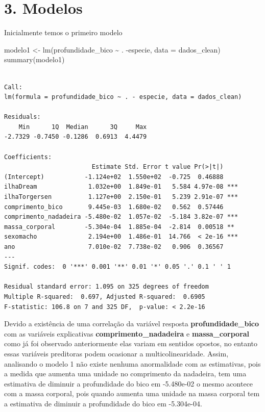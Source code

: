 \documentclass[
  letterpaper,
  DIV=11,
  numbers=noendperiod]{scrartcl}
\newenvironment{Shaded}{\begin{snugshade}}{\end{snugshade}}
\newcommand{\AttributeTok}[1]{\textcolor[rgb]{0.40,0.45,0.13}{#1}}
\newcommand{\FunctionTok}[1]{\textcolor[rgb]{0.28,0.35,0.67}{#1}}
\newcommand{\NormalTok}[1]{\textcolor[rgb]{0.00,0.23,0.31}{#1}}
\newcommand{\OtherTok}[1]{\textcolor[rgb]{0.00,0.23,0.31}{#1}}
\newcommand{\SpecialCharTok}[1]{\textcolor[rgb]{0.37,0.37,0.37}{#1}}
\begin{document}
\section{3. Modelos}\label{modelos}

Inicialmente temos o primeiro modelo

\begin{Shaded}
\begin{Highlighting}[]
\NormalTok{modelo1 }\OtherTok{\textless{}{-}} \FunctionTok{lm}\NormalTok{(profundidade\_bico }\SpecialCharTok{\textasciitilde{}}\NormalTok{ . }\SpecialCharTok{{-}}\NormalTok{especie, }\AttributeTok{data =}\NormalTok{ dados\_clean)}
\FunctionTok{summary}\NormalTok{(modelo1)}
\end{Highlighting}
\end{Shaded}

\begin{verbatim}

Call:
lm(formula = profundidade_bico ~ . - especie, data = dados_clean)

Residuals:
    Min      1Q  Median      3Q     Max 
-2.7329 -0.7450 -0.1286  0.6913  4.4479 

Coefficients:
                        Estimate Std. Error t value Pr(>|t|)    
(Intercept)           -1.124e+02  1.550e+02  -0.725  0.46888    
ilhaDream              1.032e+00  1.849e-01   5.584 4.97e-08 ***
ilhaTorgersen          1.127e+00  2.150e-01   5.239 2.91e-07 ***
comprimento_bico       9.445e-03  1.680e-02   0.562  0.57446    
comprimento_nadadeira -5.480e-02  1.057e-02  -5.184 3.82e-07 ***
massa_corporal        -5.304e-04  1.885e-04  -2.814  0.00518 ** 
sexomacho              2.194e+00  1.486e-01  14.766  < 2e-16 ***
ano                    7.010e-02  7.738e-02   0.906  0.36567    
---
Signif. codes:  0 '***' 0.001 '**' 0.01 '*' 0.05 '.' 0.1 ' ' 1

Residual standard error: 1.095 on 325 degrees of freedom
Multiple R-squared:  0.697, Adjusted R-squared:  0.6905 
F-statistic: 106.8 on 7 and 325 DF,  p-value: < 2.2e-16
\end{verbatim}

Devido a existência de uma correlação da variável resposta
\textbf{profundidade\_bico} com as variáveis explicativas
\textbf{comprimento\_nadadeira} e \textbf{massa\_corporal} como já foi
observado anteriormente elas variam em sentidos opostos, no entanto
essas variáveis preditoras podem ocasionar a multicolinearidade. Assim,
analisando o modelo 1 não existe nenhuma anormalidade com as
estimativas, pois a medida que aumenta uma unidade no comprimento da
nadadeira, tem uma estimativa de diminuir a profundidade do bico em
-5.480e-02 o mesmo acontece com a massa corporal, pois quando aumenta
uma unidade na massa corporal tem a estimativa de diminuir a
profundidade do bico em -5.304e-04.
\end{document}
